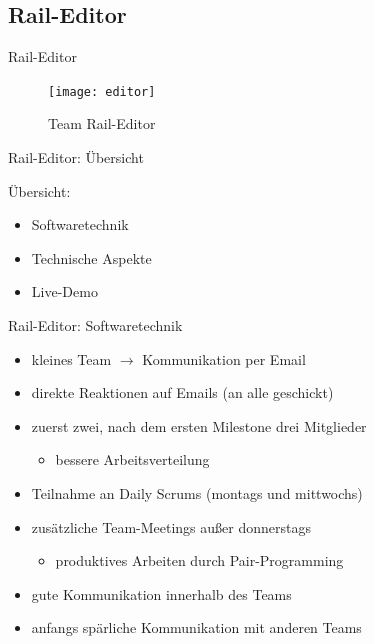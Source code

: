 \subsection{Rail-Editor}

\begin{frame}{Rail-Editor}

\begin{figure}
  \begin{center}
    \leavevmode
      \texttt{[image: editor]}
    \caption{Team Rail-Editor}
  \end{center}
\end{figure}

\end{frame}

\begin{frame}{Rail-Editor: Übersicht}

	Übersicht:
	\begin{itemize}
		\item Softwaretechnik
		\item Technische Aspekte
		\item Live-Demo
	\end{itemize}

\end{frame}

\pagebreak

\begin{frame}{Rail-Editor: Softwaretechnik}
	\begin{itemize}
		\item kleines Team $\rightarrow$ Kommunikation per Email
		\item direkte Reaktionen auf Emails (an alle geschickt)
		\item zuerst zwei, nach dem ersten Milestone drei Mitglieder
		\begin{itemize}
			\item bessere Arbeitsverteilung
		\end{itemize}
		\item Teilnahme an Daily Scrums (montags und mittwochs)
		\item zusätzliche Team-Meetings außer donnerstags
		\begin{itemize}
			\item produktives Arbeiten durch Pair-Programming
		\end{itemize}
		\item gute Kommunikation innerhalb des Teams
		\item anfangs spärliche Kommunikation mit anderen Teams
	\end{itemize}
\end{frame}

